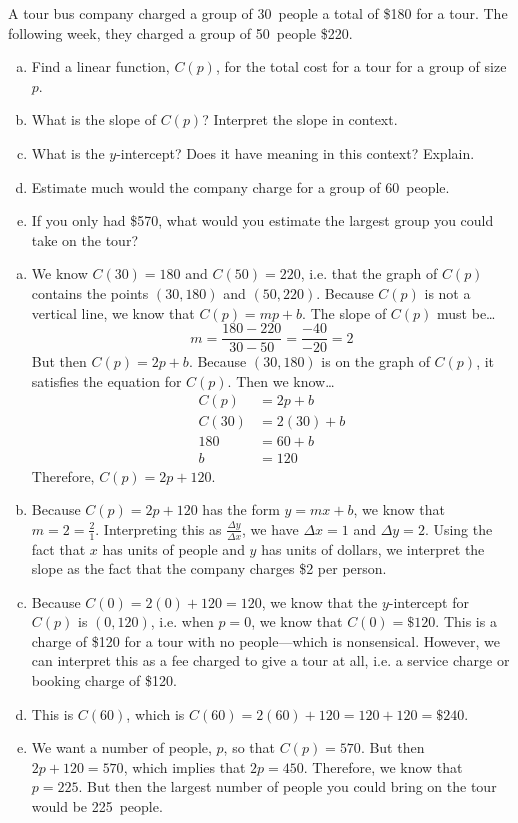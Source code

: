 \documentclass[11pt,letterpaper]{article}
\begin{document}
 A tour bus company charged a group of 30~people a total of \$180 for a tour. The following week, they charged a group of 50~people \$220.
        \begin{enumerate}[(a)]
        \item Find a linear function, $C(p)$, for the total cost for a tour for a group of size $p$. 
        \item What is the slope of $C(p)$? Interpret the slope in context. 
        \item What is the $y$-intercept? Does it have meaning in this context? Explain. 
        \item Estimate much would the company charge for a group of 60~people.
        \item If you only had \$570, what would you estimate the largest group you could take on the tour?
        \end{enumerate} \pspace

\sol
\begin{enumerate}[(a)]
\item We know $C(30)= 180$ and $C(50)= 220$, i.e. that the graph of $C(p)$ contains the points $(30, 180)$ and $(50, 220)$. Because $C(p)$ is not a vertical line, we know that $C(p)= mp + b$. The slope of $C(p)$ must be\dots
	\[
	m= \dfrac{180 - 220}{30 - 50}= \dfrac{-40}{-20}= 2
	\]
But then $C(p)= 2p + b$. Because $(30, 180)$ is on the graph of $C(p)$, it satisfies the equation for $C(p)$. Then we know\dots
	\[
	\begin{aligned}
	C(p)&= 2p + b \\
	C(30)&= 2(30) + b \\
	180&= 60 + b \\
	b&= 120
	\end{aligned}
	\]
Therefore, $C(p)= 2p + 120$. \pspace

\item Because $C(p)= 2p + 120$ has the form $y= mx + b$, we know that $m= 2= \frac{2}{1}$. Interpreting this as $\frac{\Delta y}{\Delta x}$, we have $\Delta x= 1$ and $\Delta y= 2$. Using the fact that $x$ has units of people and $y$ has units of dollars, we interpret the slope as the fact that the company charges \$2 per person. \pspace

\item Because $C(0)= 2(0) + 120= 120$, we know that the $y$-intercept for $C(p)$ is $(0, 120)$, i.e. when $p= 0$, we know that $C(0)= \$120$. This is a charge of \$120 for a tour with no people---which is nonsensical. However, we can interpret this as a fee charged to give a tour at all, i.e. a service charge or booking charge of \$120. \pspace

\item This is $C(60)$, which is $C(60)= 2(60) + 120= 120 + 120= \$240$. \pspace

\item We want a number of people, $p$, so that $C(p)= 570$. But then $2p + 120= 570$, which implies that $2p= 450$. Therefore, we know that $p= 225$. But then the largest number of people you could bring on the tour would be 225~people. 
\end{enumerate}
\end{document}
